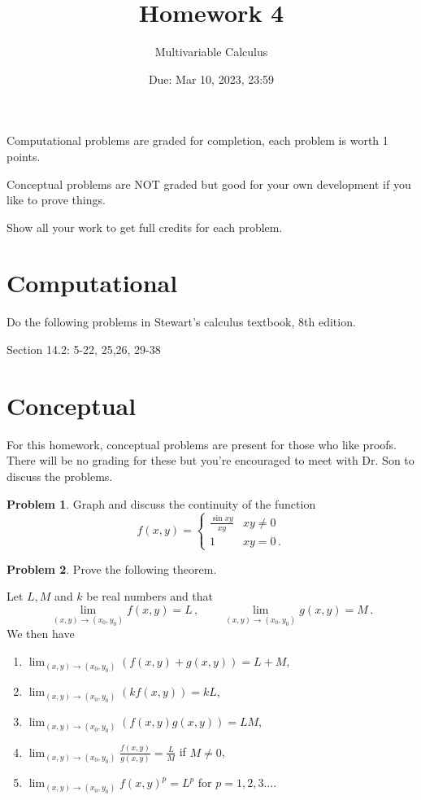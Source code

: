 \documentclass[12pt]{article}
\title{Homework 4}
\author{ Multivariable Calculus}
\date{Due: Mar 10, 2023, 23:59}
\theoremstyle{definition}
\newtheorem{problem}{Problem}
\begin{document}
\maketitle

Computational problems are graded for completion, each problem is worth 1 points.

Conceptual problems are NOT graded but good for your own development if you like to prove things.

Show all your work to get full credits for each problem.
\section{Computational}
Do the following problems in Stewart's calculus textbook, 8th edition.

Section 14.2: 5-22, 25,26, 29-38

\section{Conceptual}
For this homework, conceptual problems are present for those who like proofs.
There will be no grading for these but you're encouraged to meet with Dr. Son
to discuss the problems.

\begin{problem}
    Graph and discuss the continuity of the function
    \begin{equation*}
        f(x,y) = 
        \begin{cases}
            \frac{\sin xy}{xy} & xy\not=0 \\
            1 & xy= 0 \,.
        \end{cases}
    \end{equation*}
\end{problem}

\begin{problem}
    Prove the following theorem.



Let \(L,M\) and \(k\) be real numbers and that
\begin{equation*}
    \lim_{(x,y) \to (x_0,y_0)} f(x,y) = L \,, \qquad 
    \lim_{(x,y) \to (x_0,y_0)} g(x,y) = M \,.
\end{equation*}
We then have

\begin{enumerate}
\def\labelenumi{\arabic{enumi}.}
\item
  \(\displaystyle \lim_{(x,y) \to (x_0,y_0)} (f(x,y) + g(x,y)) = L + M\),
\item
  \(\displaystyle \lim_{(x,y) \to (x_0,y_0)} (k f(x,y)) = kL\),
\item
  \(\displaystyle \lim_{(x,y) \to (x_0,y_0)} (f(x,y) g(x,y)) = LM\),
\item
  \(\displaystyle \lim_{(x,y) \to (x_0,y_0)} \frac{f(x,y)}{g(x,y)} = \frac{L}{M}\) if \(M \not= 0\),
\item
  \(\displaystyle \lim_{(x,y) \to (x_0,y_0)} {f(x,y)^p} = L^p\) for \(p=1,2,3 \dots\).
\end{enumerate}

\end{problem}


%
\end{document}
